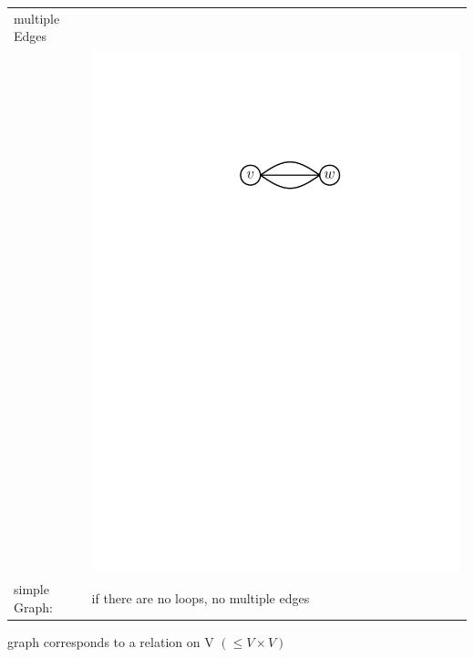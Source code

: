 \begin{tabular}{l l}
multiple Edges \\
	& \includegraphics[scale=.5]{01_graph_theory/pics/graph_multiple-edges.pdf} \\


simple Graph: & if there are no loops, no multiple edges \\


\end{tabular}

graph corresponds to a relation on V $(\leq V \times V)$

